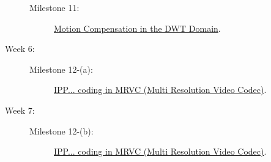 \begin{description}
\begin{description}
  \item [Milestone 11:] \href{https://sistemas-multimedia.github.io/milestones/11-MC_in_DWT_domain/}{Motion Compensation in the DWT Domain}.
  \end{description}
\item [Week 6:]
  \begin{description}
  \item [Milestone 12-(a):] \href{https://sistemas-multimedia.github.io/milestones/12-IPP_coding/}{IPP... coding in MRVC (Multi Resolution Video Codec)}.
  \end{description}
\item [Week 7:]
  \begin{description}
  \item [Milestone 12-(b):] \href{https://sistemas-multimedia.github.io/milestones/12-IPP_coding/}{IPP... coding in MRVC (Multi Resolution Video Codec)}.
  \end{description}
\end{description}
